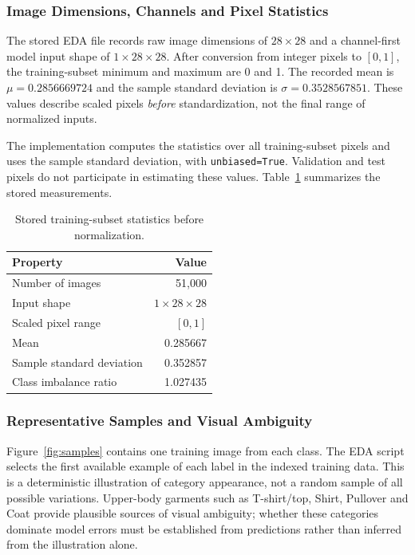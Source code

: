 \subsubsection{Image Dimensions, Channels and Pixel Statistics}
The stored EDA file records raw image dimensions of $28\times28$ and a channel-first model input shape of $1\times28\times28$. After conversion from integer pixels to $[0,1]$, the training-subset minimum and maximum are 0 and 1. The recorded mean is $\mu=0.2856669724$ and the sample standard deviation is $\sigma=0.3528567851$. These values describe scaled pixels \emph{before} standardization, not the final range of normalized inputs.

The implementation computes the statistics over all training-subset pixels and uses the sample standard deviation, with \texttt{unbiased=True}. Validation and test pixels do not participate in estimating these values. Table~\ref{tab:pixelstats} summarizes the stored measurements.

\begin{table}[htbp]
\centering
\caption{Stored training-subset statistics before normalization.}
\label{tab:pixelstats}
\begin{tabular}{@{}lr@{}}
\toprule
Property & Value \\
\midrule
Number of images & 51,000 \\
Input shape & $1\times28\times28$ \\
Scaled pixel range & $[0,1]$ \\
Mean & 0.285667 \\
Sample standard deviation & 0.352857 \\
Class imbalance ratio & 1.027435 \\
\bottomrule
\end{tabular}
\end{table}

\subsubsection{Representative Samples and Visual Ambiguity}
Figure~\ref{fig:samples} contains one training image from each class. The EDA script selects the first available example of each label in the indexed training data. This is a deterministic illustration of category appearance, not a random sample of all possible variations. Upper-body garments such as T-shirt/top, Shirt, Pullover and Coat provide plausible sources of visual ambiguity; whether these categories dominate model errors must be established from predictions rather than inferred from the illustration alone.

